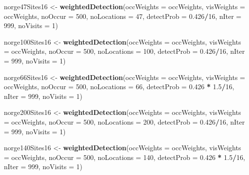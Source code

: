 \documentclass[]{article}
\newenvironment{Shaded}{\begin{snugshade}}{\end{snugshade}}
\newcommand{\KeywordTok}[1]{\textcolor[rgb]{0.13,0.29,0.53}{\textbf{#1}}}
\newcommand{\DataTypeTok}[1]{\textcolor[rgb]{0.13,0.29,0.53}{#1}}
\newcommand{\DecValTok}[1]{\textcolor[rgb]{0.00,0.00,0.81}{#1}}
\newcommand{\FloatTok}[1]{\textcolor[rgb]{0.00,0.00,0.81}{#1}}
\newcommand{\StringTok}[1]{\textcolor[rgb]{0.31,0.60,0.02}{#1}}
\newcommand{\OperatorTok}[1]{\textcolor[rgb]{0.81,0.36,0.00}{\textbf{#1}}}
\newcommand{\NormalTok}[1]{#1}
\begin{document}
\begin{Shaded}
\begin{Highlighting}[]
\NormalTok{norge47Sites16 <-}\StringTok{ }\KeywordTok{weightedDetection}\NormalTok{(}\DataTypeTok{occWeights =}\NormalTok{ occWeights, }\DataTypeTok{visWeights =}\NormalTok{ occWeights, }
    \DataTypeTok{noOccur =} \DecValTok{500}\NormalTok{, }\DataTypeTok{noLocations =} \DecValTok{47}\NormalTok{, }\DataTypeTok{detectProb =} \FloatTok{0.426}\OperatorTok{/}\DecValTok{16}\NormalTok{, }\DataTypeTok{nIter =} \DecValTok{999}\NormalTok{, }\DataTypeTok{noVisits =} \DecValTok{1}\NormalTok{)}

\NormalTok{norge100Sites16 <-}\StringTok{ }\KeywordTok{weightedDetection}\NormalTok{(}\DataTypeTok{occWeights =}\NormalTok{ occWeights, }\DataTypeTok{visWeights =}\NormalTok{ occWeights, }
    \DataTypeTok{noOccur =} \DecValTok{500}\NormalTok{, }\DataTypeTok{noLocations =} \DecValTok{100}\NormalTok{, }\DataTypeTok{detectProb =} \FloatTok{0.426}\OperatorTok{/}\DecValTok{16}\NormalTok{, }\DataTypeTok{nIter =} \DecValTok{999}\NormalTok{, }\DataTypeTok{noVisits =} \DecValTok{1}\NormalTok{)}


\NormalTok{norge66Sites16 <-}\StringTok{ }\KeywordTok{weightedDetection}\NormalTok{(}\DataTypeTok{occWeights =}\NormalTok{ occWeights, }\DataTypeTok{visWeights =}\NormalTok{ occWeights, }
    \DataTypeTok{noOccur =} \DecValTok{500}\NormalTok{, }\DataTypeTok{noLocations =} \DecValTok{66}\NormalTok{, }\DataTypeTok{detectProb =} \FloatTok{0.426} \OperatorTok{*}\StringTok{ }\FloatTok{1.5}\OperatorTok{/}\DecValTok{16}\NormalTok{, }\DataTypeTok{nIter =} \DecValTok{999}\NormalTok{, }
    \DataTypeTok{noVisits =} \DecValTok{1}\NormalTok{)}

\NormalTok{norge200Sites16 <-}\StringTok{ }\KeywordTok{weightedDetection}\NormalTok{(}\DataTypeTok{occWeights =}\NormalTok{ occWeights, }\DataTypeTok{visWeights =}\NormalTok{ occWeights, }
    \DataTypeTok{noOccur =} \DecValTok{500}\NormalTok{, }\DataTypeTok{noLocations =} \DecValTok{200}\NormalTok{, }\DataTypeTok{detectProb =} \FloatTok{0.426}\OperatorTok{/}\DecValTok{16}\NormalTok{, }\DataTypeTok{nIter =} \DecValTok{999}\NormalTok{, }\DataTypeTok{noVisits =} \DecValTok{1}\NormalTok{)}

\NormalTok{norge140Sites16 <-}\StringTok{ }\KeywordTok{weightedDetection}\NormalTok{(}\DataTypeTok{occWeights =}\NormalTok{ occWeights, }\DataTypeTok{visWeights =}\NormalTok{ occWeights, }
    \DataTypeTok{noOccur =} \DecValTok{500}\NormalTok{, }\DataTypeTok{noLocations =} \DecValTok{140}\NormalTok{, }\DataTypeTok{detectProb =} \FloatTok{0.426} \OperatorTok{*}\StringTok{ }\FloatTok{1.5}\OperatorTok{/}\DecValTok{16}\NormalTok{, }\DataTypeTok{nIter =} \DecValTok{999}\NormalTok{, }
    \DataTypeTok{noVisits =} \DecValTok{1}\NormalTok{)}



\end{Highlighting}
\end{Shaded}
\end{document}

